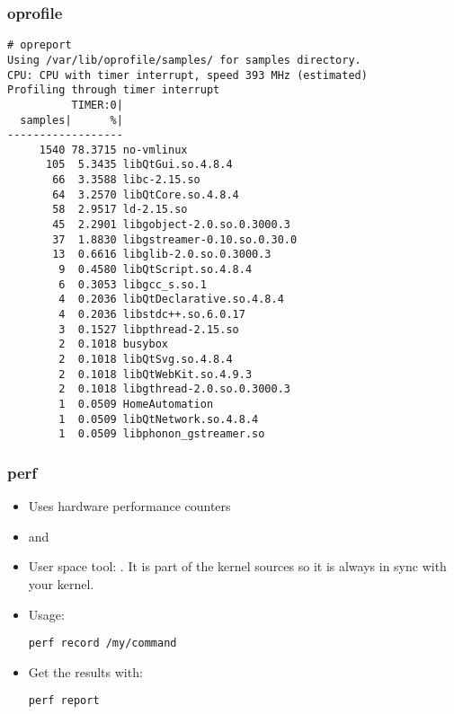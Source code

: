 \begin{frame}[fragile]
\frametitle{oprofile}
\begin{block}{}
\tiny
\begin{verbatim}
# opreport
Using /var/lib/oprofile/samples/ for samples directory.
CPU: CPU with timer interrupt, speed 393 MHz (estimated)
Profiling through timer interrupt
          TIMER:0|
  samples|      %|
------------------
     1540 78.3715 no-vmlinux
      105  5.3435 libQtGui.so.4.8.4
       66  3.3588 libc-2.15.so
       64  3.2570 libQtCore.so.4.8.4
       58  2.9517 ld-2.15.so
       45  2.2901 libgobject-2.0.so.0.3000.3
       37  1.8830 libgstreamer-0.10.so.0.30.0
       13  0.6616 libglib-2.0.so.0.3000.3
        9  0.4580 libQtScript.so.4.8.4
        6  0.3053 libgcc_s.so.1
        4  0.2036 libQtDeclarative.so.4.8.4
        4  0.2036 libstdc++.so.6.0.17
        3  0.1527 libpthread-2.15.so
        2  0.1018 busybox
        2  0.1018 libQtSvg.so.4.8.4
        2  0.1018 libQtWebKit.so.4.9.3
        2  0.1018 libgthread-2.0.so.0.3000.3
        1  0.0509 HomeAutomation
        1  0.0509 libQtNetwork.so.4.8.4
        1  0.0509 libphonon_gstreamer.so
\end{verbatim}
\end{block}
\end{frame}

\begin{frame}[fragile]
\frametitle{perf}
\begin{itemize}
	\item Uses hardware performance counters
	\item {} and 
	\item User space tool: . It is part of the kernel
		sources so it is always in sync with your kernel.
	\item Usage:
	\begin{block}{}
\begin{verbatim}
perf record /my/command
\end{verbatim}
	\end{block}
	\item Get the results with:
	\begin{block}{}
\begin{verbatim}
perf report
\end{verbatim}
	\end{block}
\end{itemize}
\end{frame}

